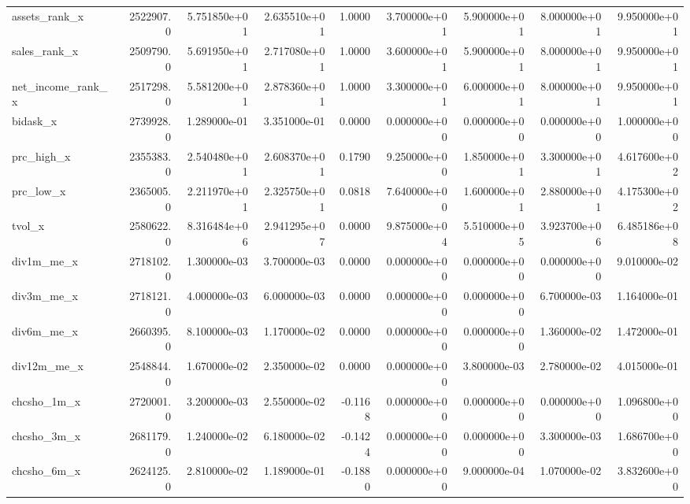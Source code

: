 \documentclass[12pt]{article}
\begin{document}
\begin{landscape}
\begin{longtable}{|l|r|r|r|r|r|r|r|r|}
assets\_rank\_x           &  2522907.0 &  5.751850e+01 &  2.635510e+01 &      1.0000 &  3.700000e+01 &  5.900000e+01 &  8.000000e+01 &  9.950000e+01 \\
sales\_rank\_x            &  2509790.0 &  5.691950e+01 &  2.717080e+01 &      1.0000 &  3.600000e+01 &  5.900000e+01 &  8.000000e+01 &  9.950000e+01 \\
net\_income\_rank\_x       &  2517298.0 &  5.581200e+01 &  2.878360e+01 &      1.0000 &  3.300000e+01 &  6.000000e+01 &  8.000000e+01 &  9.950000e+01 \\
bidask\_x                &  2739928.0 &  1.289000e-01 &  3.351000e-01 &      0.0000 &  0.000000e+00 &  0.000000e+00 &  0.000000e+00 &  1.000000e+00 \\
prc\_high\_x              &  2355383.0 &  2.540480e+01 &  2.608370e+01 &      0.1790 &  9.250000e+00 &  1.850000e+01 &  3.300000e+01 &  4.617600e+02 \\
prc\_low\_x               &  2365005.0 &  2.211970e+01 &  2.325750e+01 &      0.0818 &  7.640000e+00 &  1.600000e+01 &  2.880000e+01 &  4.175300e+02 \\
tvol\_x                  &  2580622.0 &  8.316484e+06 &  2.941295e+07 &      0.0000 &  9.875000e+04 &  5.510000e+05 &  3.923700e+06 &  6.485186e+08 \\
div1m\_me\_x              &  2718102.0 &  1.300000e-03 &  3.700000e-03 &      0.0000 &  0.000000e+00 &  0.000000e+00 &  0.000000e+00 &  9.010000e-02 \\
div3m\_me\_x              &  2718121.0 &  4.000000e-03 &  6.000000e-03 &      0.0000 &  0.000000e+00 &  0.000000e+00 &  6.700000e-03 &  1.164000e-01 \\
div6m\_me\_x              &  2660395.0 &  8.100000e-03 &  1.170000e-02 &      0.0000 &  0.000000e+00 &  0.000000e+00 &  1.360000e-02 &  1.472000e-01 \\
div12m\_me\_x             &  2548844.0 &  1.670000e-02 &  2.350000e-02 &      0.0000 &  0.000000e+00 &  3.800000e-03 &  2.780000e-02 &  4.015000e-01 \\
chcsho\_1m\_x             &  2720001.0 &  3.200000e-03 &  2.550000e-02 &     -0.1168 &  0.000000e+00 &  0.000000e+00 &  0.000000e+00 &  1.096800e+00 \\
chcsho\_3m\_x             &  2681179.0 &  1.240000e-02 &  6.180000e-02 &     -0.1424 &  0.000000e+00 &  0.000000e+00 &  3.300000e-03 &  1.686700e+00 \\
chcsho\_6m\_x             &  2624125.0 &  2.810000e-02 &  1.189000e-01 &     -0.1880 &  0.000000e+00 &  9.000000e-04 &  1.070000e-02 &  3.832600e+00 \\

\end{longtable}
\end{landscape}
\end{document}
